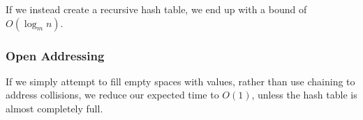 If we instead create a recursive hash table, we end up with a bound of $O(\log_m n)$.

\subsubsection{Open Addressing}
If we simply attempt to fill empty spaces with values, rather than use chaining to address collisions, we reduce our expected time to $O(1)$, unless the hash table is almost completely full.
